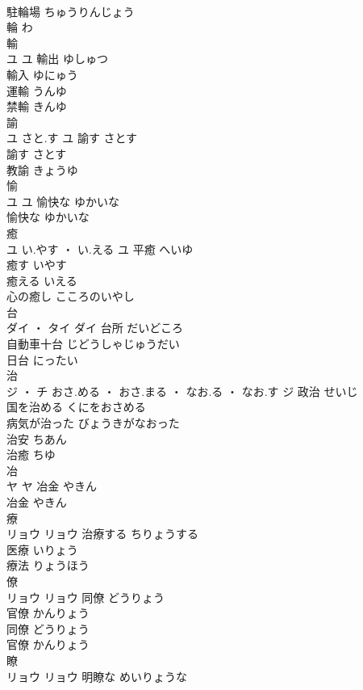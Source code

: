 \documentclass[8pt]{extreport}
\begin{document}
\begin{CJK}{UTF8}{min}
\\	駐輪場	ちゅうりんじょう	
\\	輪	わ	
\\	輸	
\\	ユ		ユ	輸出	ゆしゅつ	
\\	輸入	ゆにゅう	
\\	運輸	うんゆ	
\\	禁輸	きんゆ	
\\	諭	
\\	ユ	さと.す	ユ	諭す	さとす	
\\	諭す	さとす	
\\	教諭	きょうゆ	
\\	愉	
\\	ユ		ユ	愉快な	ゆかいな	
\\	愉快な	ゆかいな	
\\	癒	
\\	ユ	い.やす ・ い.える	ユ	平癒	へいゆ	
\\	癒す	いやす	
\\	癒える	いえる	
\\	心の癒し	こころのいやし	
\\	台	
\\	ダイ ・ タイ		ダイ	台所	だいどころ	
\\	自動車十台	じどうしゃじゅうだい	
\\	日台	にったい	
\\	治	
\\	ジ ・ チ	おさ.める ・ おさ.まる ・ なお.る ・ なお.す	ジ	政治	せいじ	
\\	国を治める	くにをおさめる	
\\	病気が治った	びょうきがなおった	
\\	治安	ちあん	
\\	治癒	ちゆ	
\\	冶	
\\	ヤ		ヤ	冶金	やきん	
\\	冶金	やきん	
\\	療	
\\	リョウ		リョウ	治療する	ちりょうする	
\\	医療	いりょう	
\\	療法	りょうほう	
\\	僚	
\\	リョウ		リョウ	同僚	どうりょう	
\\	官僚	かんりょう	
\\	同僚	どうりょう	
\\	官僚	かんりょう	
\\	瞭	
\\	リョウ		リョウ	明瞭な	めいりょうな	

\end{CJK}
\end{document}
